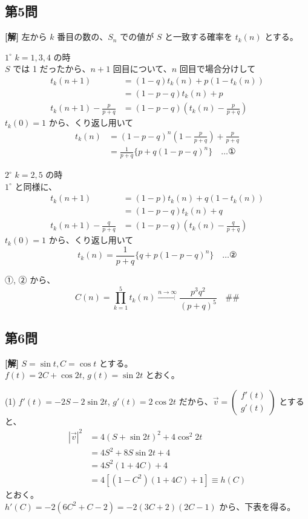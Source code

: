\documentclass[../main.tex]{subfiles}
\begin{document}
\subsection*{第5問}

\noindent
\textbf{[解]} 左から $k$ 番目の数の、$S_n$ での値が $S$ と一致する確率を $t_k(n)$ とする。

\bigskip
\noindent
$1^\circ$ $k=1,3,4$ の時\\
$S$ では 1 だったから、$n+1$ 回目について、$n$ 回目で場合分けして
\begin{align*}
  t_k(n+1) &= (1-q) t_k(n) + p(1 - t_k(n)) \\
  &= (1-p-q) t_k(n) + p \\
  t_k(n+1) - \frac{p}{p+q} &= (1-p-q) \left( t_k(n) - \frac{p}{p+q} \right)
\end{align*}
$t_k(0) = 1$ から、くり返し用いて
\begin{align*}
  t_k(n) &= (1-p-q)^n \left( 1 - \frac{p}{p+q} \right) + \frac{p}{p+q} \\
  &= \frac{1}{p+q} \{ p + q(1-p-q)^n \} \quad \dots \text{①}
\end{align*}

\bigskip
\noindent
$2^\circ$ $k=2,5$ の時\\
$1^\circ$ と同様に、
\begin{align*}
  t_k(n+1) &= (1-p) t_k(n) + q(1 - t_k(n)) \\
  &= (1-p-q) t_k(n) + q \\
  t_k(n+1) - \frac{q}{p+q} &= (1-p-q) \left( t_k(n) - \frac{q}{p+q} \right)
\end{align*}
$t_k(0) = 1$ から、くり返し用いて
\[
  t_k(n) = \frac{1}{p+q} \{ q + p(1-p-q)^n \} \quad \dots \text{②}
\]

\bigskip
\noindent
①, ② から、
\[
  C(n) = \prod_{k=1}^5 t_k(n) \xrightarrow{n \to \infty} \frac{p^3 q^2}{(p+q)^5} \quad \text{\#\#}
\]

\newpage

\subsection*{第6問}

\noindent
\textbf{[解]} $S = \sin t, C = \cos t$ とする。\\
$f(t) = 2C + \cos 2t$, $g(t) = \sin 2t$ とおく。

\bigskip
\noindent
(1) $f'(t) = -2S - 2\sin 2t$, $g'(t) = 2\cos 2t$ だから、$\vec{v} =
\begin{pmatrix} f'(t) \\ g'(t)
\end{pmatrix}$ とすると、
\begin{align*}
  |\vec{v}|^2 &= 4(S + \sin 2t)^2 + 4\cos^2 2t \\
  &= 4S^2 + 8S \sin 2t + 4 \\
  &= 4S^2(1 + 4C) + 4 \\
  &= 4[(1-C^2)(1+4C) + 1] \equiv h(C)
\end{align*}
とおく。\\
$h'(C) = -2(6C^2 + C - 2) = -2(3C+2)(2C-1)$ から、下表を得る。
\end{document}
